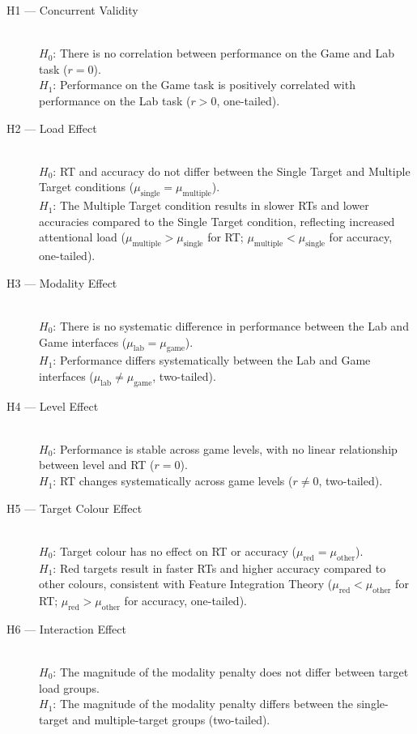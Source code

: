\documentclass[12pt]{article}
\begin{document}
\begin{description}
  \item[H1 --- Concurrent Validity] \hfill \\
    $H_0$: There is no correlation between performance on the Game and Lab task ($r = 0$). \\
    $H_1$: Performance on the Game task is positively correlated with performance on the Lab task ($r > 0$, one-tailed).
  \item[H2 --- Load Effect] \hfill \\
    $H_0$: RT and accuracy do not differ between the Single Target and Multiple Target conditions ($\mu_{\text{single}} = \mu_{\text{multiple}}$). \\
    $H_1$: The Multiple Target condition results in slower RTs and lower accuracies compared to the Single Target condition, reflecting increased attentional load ($\mu_{\text{multiple}} > \mu_{\text{single}}$ for RT; $\mu_{\text{multiple}} < \mu_{\text{single}}$ for accuracy, one-tailed).
  \item[H3 --- Modality Effect] \hfill \\
    $H_0$: There is no systematic difference in performance between the Lab and Game interfaces ($\mu_{\text{lab}} = \mu_{\text{game}}$). \\
    $H_1$: Performance differs systematically between the Lab and Game interfaces ($\mu_{\text{lab}} \neq \mu_{\text{game}}$, two-tailed).
  \item[H4 --- Level Effect] \hfill \\
    $H_0$: Performance is stable across game levels, with no linear relationship between level and RT ($r = 0$). \\
    $H_1$: RT changes systematically across game levels ($r \neq 0$, two-tailed).
  \item[H5 --- Target Colour Effect] \hfill \\
    $H_0$: Target colour has no effect on RT or accuracy ($\mu_{\text{red}} = \mu_{\text{other}}$). \\
    $H_1$: Red targets result in faster RTs and higher accuracy compared to other colours, consistent with Feature Integration Theory \citep{treisman1980feature} ($\mu_{\text{red}} < \mu_{\text{other}}$ for RT; $\mu_{\text{red}} > \mu_{\text{other}}$ for accuracy, one-tailed).
  \item[H6 --- Interaction Effect] \hfill \\
    $H_0$: The magnitude of the modality penalty does not differ between target load groups. \\
    $H_1$: The magnitude of the modality penalty differs between the single-target and multiple-target groups (two-tailed).
\end{description}
\end{document}
